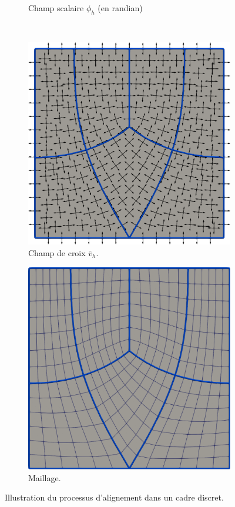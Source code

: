 \begin{figure}[h!]
\begin{subfigure}{0.45\textwidth}
    \caption{Champ scalaire $\phi_h$ (en randian)}
    \label{fig:alignment_2}
\end{subfigure}
\\[0.1cm]
\begin{subfigure}{0.5\textwidth}
    \includegraphics[width=\textwidth]{images/alignment_3.pdf}
    \caption{Champ de croix $\bar{v}_h$.}
    \label{fig:alignment_3}
\end{subfigure}
\hfill
\begin{subfigure}{0.482\textwidth}
    \includegraphics[width=\textwidth]{images/alignment_4.pdf}
    \caption{Maillage.}
    \label{fig:alignment_4}
\end{subfigure}
\caption{Illustration du processus d'alignement dans un cadre discret.}
\label{fig:alignment}
\end{figure}


